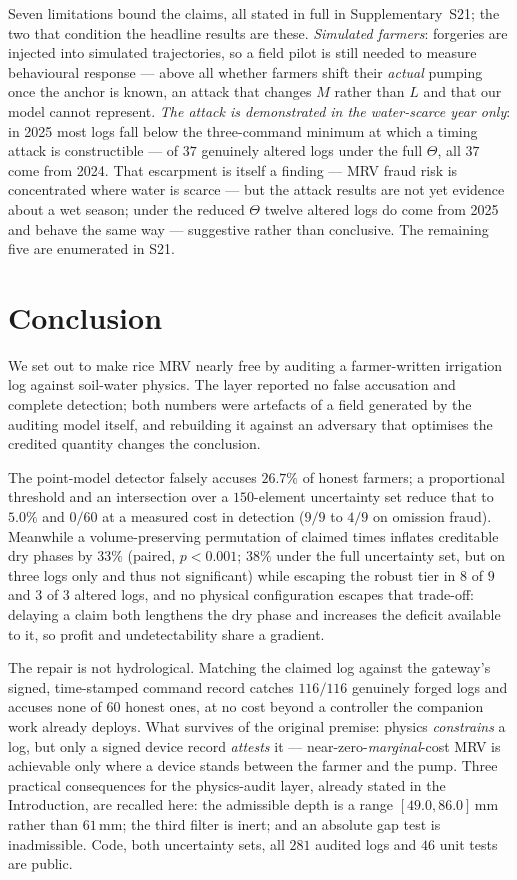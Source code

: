 Seven limitations bound the claims, all stated in full in Supplementary~S21;
the two that condition the headline results are these. \emph{Simulated
farmers}: forgeries are injected into simulated trajectories, so a field pilot
is still needed to measure behavioural response --- above all whether farmers
shift their \emph{actual} pumping once the anchor is known, an attack that
changes $M$ rather than $L$ and that our model cannot represent. \emph{The
attack is demonstrated in the water-scarce year only}: in 2025 most logs fall
below the three-command minimum at which a timing attack is constructible ---
of $37$ genuinely altered logs under the full $\Theta$, all $37$ come from
2024. That escarpment is itself a finding --- MRV fraud risk is concentrated
where water is scarce --- but the attack results are not yet evidence about a
wet season; under the reduced $\Theta$ twelve altered logs do come from 2025
and behave the same way --- suggestive rather than conclusive. The remaining
five are enumerated in S21.

\section{Conclusion}

We set out to make rice MRV nearly free by auditing a farmer-written irrigation
log against soil-water physics. The layer reported no false accusation and complete detection; both numbers were artefacts of a field
generated by the auditing model itself, and rebuilding it against an adversary
that optimises the credited quantity changes the conclusion.

The point-model detector falsely accuses $26.7\%$ of honest farmers; a
proportional threshold and an intersection over a $150$-element uncertainty
set reduce that to $5.0\%$ and $0/60$ at a measured cost in detection ($9/9$
to $4/9$ on omission fraud). Meanwhile a volume-preserving permutation of
claimed times inflates creditable dry phases by $33\%$ (paired, $p<0.001$;
$38\%$ under the full uncertainty set, but on three logs only and thus not
significant) while
escaping the robust tier in $8$ of $9$ and $3$ of $3$ altered logs, and no
physical configuration escapes that trade-off: delaying a claim both lengthens
the dry phase and increases the deficit available to it, so profit and
undetectability share a gradient.

The repair is not hydrological. Matching the claimed log against the gateway's
signed, time-stamped command record catches $116/116$ genuinely forged logs and
accuses none of $60$ honest ones, at no cost beyond a controller the companion
work already deploys. What survives of the original premise: physics
\emph{constrains} a log, but only a signed device record \emph{attests} it
--- near-zero-\emph{marginal}-cost MRV is achievable only where a device stands
between the
farmer and the pump. Three practical consequences for the physics-audit layer, already stated in the Introduction, are recalled here: the admissible depth is a range $[49.0,86.0]$\,mm rather than $61$\,mm; the third filter is inert; and an absolute gap test is inadmissible. Code, both uncertainty sets, all $281$
audited logs and $46$ unit tests are public.
